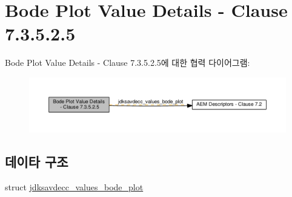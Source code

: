 \hypertarget{group__values__bode__plot}{}\section{Bode Plot Value Details -\/ Clause 7.3.5.2.5}
\label{group__values__bode__plot}
Bode Plot Value Details -\/ Clause 7.3.5.2.5에 대한 협력 다이어그램\+:
\nopagebreak
\begin{figure}[H]
\begin{center}
\leavevmode
\includegraphics[width=350pt]{group__values__bode__plot}
\end{center}
\end{figure}
\subsection*{데이타 구조}
\begin{DoxyCompactItemize}
\item 
struct \hyperlink{structjdksavdecc__values__bode__plot}{jdksavdecc\+\_\+values\+\_\+bode\+\_\+plot}
\end{DoxyCompactItemize}
